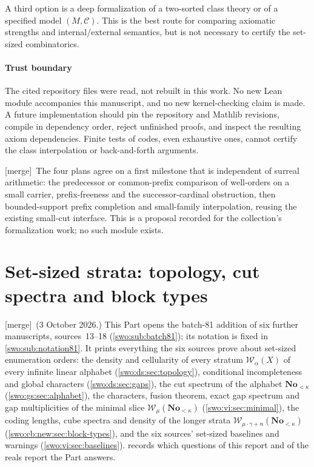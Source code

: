 \documentclass[11pt]{article}
\theoremstyle{definition}
\theoremstyle{remark}
\newcommand{\No}{\mathbf{No}}
\newcommand{\WO}{\mathcal W}
\newcommand{\merge}{\textsf{[merge]}}
\begin{document}
A third option is a deep formalization of a two-sorted class theory or
of a specified model $(M,\mathcal C)$. This is the best route for
comparing axiomatic strengths and internal/external semantics, but is
not necessary to certify the set-sized combinatorics.

\subsection{Trust boundary}

The cited repository files were read, not rebuilt in this work. No new
Lean module accompanies this manuscript, and no new kernel-checking
claim is made. A future implementation should pin the repository and
Mathlib revisions, compile in dependency order, reject unfinished
proofs, and inspect the resulting axiom dependencies. Finite tests of
codes, even exhaustive ones, cannot certify the class interpolation or
back-and-forth arguments.


\merge\ The four plans agree on a first milestone that is independent of
surreal arithmetic: the predecessor or common-prefix comparison of
well-orders on a small carrier, prefix-freeness and the
successor-cardinal obstruction, then bounded-support prefix completion and
small-family interpolation, reusing the existing small-cut interface. This
is a proposal recorded for the collection's formalization work; no such
module exists.

\part{Set-sized strata: topology, cut spectra and block types}\label{swo:part:strata}

\merge\ (3 October 2026.) This Part opens the batch-81 addition of six
further manuscripts, sources~13--18 (\cref{swo:sub:batch81}); its notation is
fixed in \cref{swo:sub:notation81}. It prints everything the six sources prove
about set-sized enumeration orders: the density and cellularity of every
stratum $\WO_\alpha(X)$ of every infinite linear alphabet
(\cref{swo:ds:sec:topology}), conditional incompleteness and global
characters (\cref{swo:ds:sec:gaps}), the cut spectrum of the alphabet
$\No_{<\kappa}$ (\cref{swo:gs:sec:alphabet}), the characters, fusion theorem,
exact gap spectrum and gap multiplicities of the minimal slice
$\WO_\mu(\No_{<\kappa})$ (\cref{swo:vi:sec:minimal}), the coding lengths,
cube spectra and density of the longer strata $\WO_{\mu\cdot\gamma+n}(\No_{<\kappa})$
(\cref{swo:cb:new:sec:block-types}), and the six sources' set-sized baselines
and warnings (\cref{swo:vi:sec:baselines}).  records
which questions of this report and of the reals report the Part answers.
\end{document}
